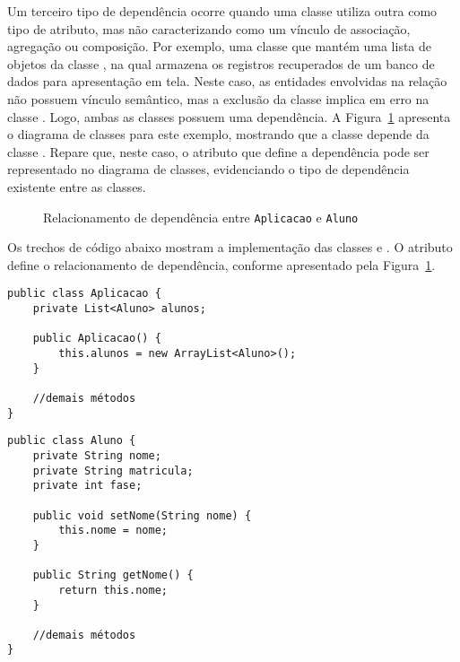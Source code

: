 Um terceiro tipo de dependência ocorre quando uma classe utiliza outra como tipo de atributo, mas não caracterizando como um vínculo de associação, agregação ou composição. Por exemplo, uma classe  que mantém uma lista de objetos da classe , na qual armazena os registros recuperados de um banco de dados para apresentação em tela. Neste caso, as entidades envolvidas na relação não possuem vínculo semântico, mas a exclusão da classe  implica em erro na classe . Logo, ambas as classes possuem uma dependência. A Figura~\ref{fig:dependencia-aplicacao-aluno} apresenta o diagrama de classes para este exemplo, mostrando que a classe  depende da classe . Repare que, neste caso, o atributo que define a dependência pode ser representado no diagrama de classes, evidenciando o tipo de dependência existente entre as classes.

\begin{figure}[h]
	\centering
	
	
	\caption{Relacionamento de dependência entre \texttt{Aplicacao} e \texttt{Aluno}}
	\label{fig:dependencia-aplicacao-aluno}
\end{figure}

Os trechos de código abaixo mostram a implementação das classes  e . O atributo  define o relacionamento de dependência, conforme apresentado pela Figura~\ref{fig:dependencia-aplicacao-aluno}.

\begin{verbatim}
public class Aplicacao {
	private List<Aluno> alunos;
	
	public Aplicacao() {
		this.alunos = new ArrayList<Aluno>();
	}
	
	//demais métodos
}
\end{verbatim}

\begin{verbatim}
public class Aluno {
	private String nome;
	private String matricula;
	private int fase;
	
	public void setNome(String nome) {
		this.nome = nome;
	}
	
	public String getNome() {
		return this.nome;
	}
	
	//demais métodos
}
\end{verbatim}

